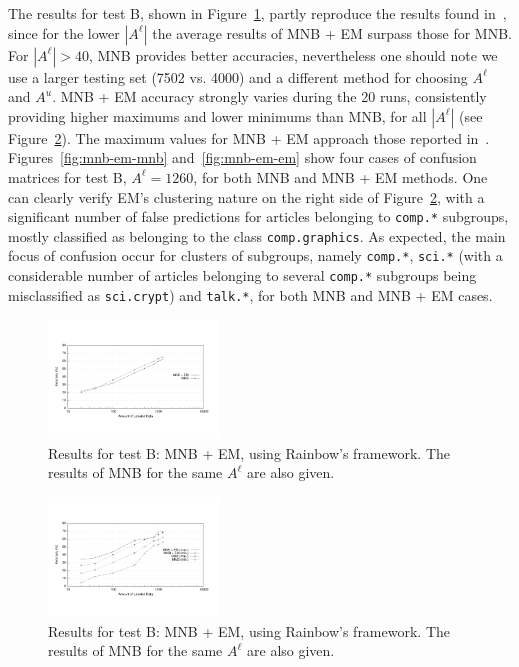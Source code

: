 The results for test B, shown in Figure~\ref{fig:mnb-em}, partly reproduce the 
results found in~\cite{Nigam2000}, since for the lower $|A^\ell|$ the average 
results of MNB + EM surpass those for MNB. For $|A^\ell| > 40$, MNB provides 
better accuracies, nevertheless one should 
note we use a larger testing set (7502 vs. 4000) and a different method 
for choosing $A^\ell$ and $A^u$. MNB + EM accuracy strongly varies during 
the 20 runs, consistently providing higher maximums and lower minimums than 
MNB, for all $|A^\ell|$ (see Figure~\ref{fig:mnb-em-max-min}). The maximum values 
for MNB + EM approach those reported in~\cite{Nigam2000}. 
Figures~\ref{fig:mnb-em-mnb} and~\ref{fig:mnb-em-em} show four cases of 
confusion matrices for test B, $A^\ell = 1260$, for both MNB and MNB + EM 
methods. One can clearly verify EM's clustering nature on the right side of 
Figure~\ref{fig:mnb-em-max-min}, with a significant number of false predictions 
for articles belonging to \verb+comp.*+ subgroups, mostly classified as 
belonging to the class \verb+comp.graphics+. As expected, the main focus of 
confusion occur for clusters of subgroups, namely \verb+comp.*+, \verb+sci.*+ (with a considerable 
number of articles belonging to several \verb+comp.*+ subgroups being misclassified 
as \verb+sci.crypt+) and \verb+talk.*+, for both MNB and MNB + EM cases.

\begin{figure}[h!]

    \centering
    \includegraphics[width=0.40\textwidth]{figures/em.pdf}
    \cprotect\caption{Results for test B: MNB + EM, using Rainbow's framework. 
        The results of MNB for the same $A^\ell$ are also given.}
    \label{fig:mnb-em}

\end{figure}

\begin{figure}[h!]

    \centering
    \includegraphics[width=0.40\textwidth]{figures/em-max-min.pdf}
    \cprotect\caption{Results for test B: MNB + EM, using Rainbow's framework. 
        The results of MNB for the same $A^\ell$ are also given.}
    \label{fig:mnb-em-max-min}

\end{figure}

